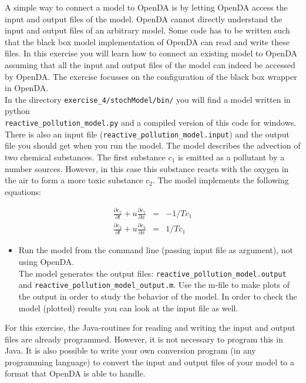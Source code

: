 
A simple way to connect a model to OpenDA is by letting OpenDA access the input
and output files of the model. OpenDA cannot directly understand the input and
output files of an arbitrary model. Some code has to be written such that the
black box model implementation of OpenDA can read and write these files. In
this exercise you will learn how to connect an existing model to OpenDA
assuming that all the input and output files of the model can indeed be
accessed by OpenDA. The exercise focusses on the configuration of the black box
wrapper in OpenDA.\\

In the directory {\tt exercise\_4/stochModel/bin/} you will find a model written in python \\
{\tt reactive\_pollution\_model.py} and a compiled version of this code for
windows. There is also an input file ({\tt reactive\_pollution\_model.input})
and the output file you should get when you run the model. The model describes
the advection of two chemical substances. The first substance $c_1$ is emitted
as a pollutant by a number sources. However, in this case this substance reacts
with the oxygen in the air to form a more toxic substance $c_2$. The model
implements the following equations:

\begin{eqnarray}
    \frac{\partial c_1}{\partial t} + u\frac{\partial c_1}{\partial x} & = & -
    1/T c_1 \\
    \frac{\partial c_2}{\partial t} + u\frac{\partial c_2}{\partial x} & = &
    1/T c_1
\end{eqnarray}

\begin{itemize}
\item Run the model from the command line (passing input file as argument),
not using OpenDA.\\
The model
  generates the output files: {\tt reactive\_pollution\_model.output} and
  {\tt reactive\_pollution\_model\_output.m}. Use the m-file to make plots
  of the output in order to study the behavior of the model. In order to check
  the model (plotted) results you can look at the input file as well.
\end{itemize}

For this exercise, the Java-routines for reading and writing the input and
output files are already programmed. However, it is not necessary to program
this in Java. It is also possible to write your own conversion program (in any
programming language) to convert the input and output files of your model to a
format that OpenDA is able to handle.

